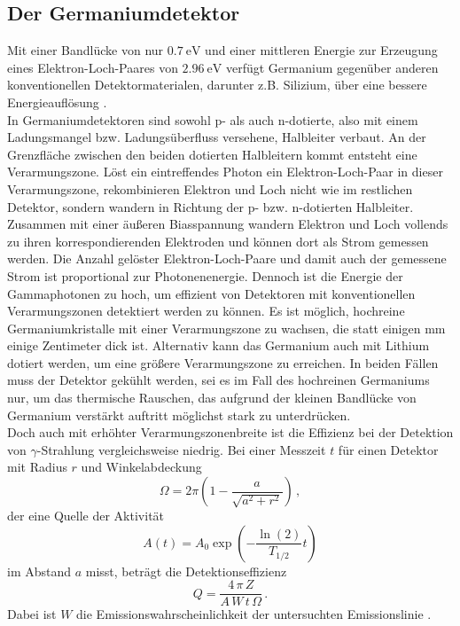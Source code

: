 \subsection{Der Germaniumdetektor}

Mit einer Bandlücke von nur $\SI{0,7}{\eV}$ und einer mittleren Energie zur Erzeugung eines Elektron-Loch-Paares von $\SI{2,96}{\eV}$ verfügt Germanium gegenüber anderen
konventionellen Detektormaterialen, darunter z.B. Silizium, über eine bessere Energieauflösung \cite{Teilchendetektoren}. \\
In Germaniumdetektoren sind sowohl p- als auch n-dotierte, also mit einem Ladungsmangel bzw. Ladungsüberfluss versehene, 
Halbleiter verbaut.
An der Grenzfläche zwischen den beiden dotierten Halbleitern kommt entsteht eine Verarmungszone. 
Löst ein eintreffendes Photon ein Elektron-Loch-Paar in dieser Verarmungszone,
rekombinieren Elektron und Loch nicht wie im restlichen Detektor, sondern wandern in Richtung der p- bzw. n-dotierten Halbleiter.
Zusammen mit einer äußeren Biasspannung wandern Elektron und Loch vollends zu ihren korrespondierenden Elektroden und können dort als Strom gemessen werden.
Die Anzahl gelöster Elektron-Loch-Paare und damit auch der gemessene Strom ist proportional zur Photonenenergie.
Dennoch ist die Energie der Gammaphotonen zu hoch, um effizient von Detektoren mit konventionellen Verarmungszonen detektiert werden zu können.
Es ist möglich, hochreine Germaniumkristalle mit einer Verarmungszone zu wachsen, die statt einigen $\si{\milli\meter}$ einige Zentimeter dick ist.
Alternativ kann das Germanium auch mit Lithium dotiert werden, um eine größere Verarmungszone zu erreichen.
In beiden Fällen muss der Detektor gekühlt werden, sei es im Fall des hochreinen Germaniums nur, um das thermische Rauschen,
das aufgrund der kleinen Bandlücke von Germanium verstärkt auftritt möglichst stark zu unterdrücken. \\

Doch auch mit erhöhter Verarmungszonenbreite ist die Effizienz bei der Detektion von $\gamma$-Strahlung vergleichsweise niedrig.
Bei einer Messzeit $t$ für einen Detektor mit Radius $r$ und Winkelabdeckung
\begin{equation*}
    \Omega = 2 \pi \left(1 - \frac{a}{\sqrt{a^2 + r^2}}\right) \,,
\end{equation*}
der eine Quelle der Aktivität
\begin{equation*}
    A(t) = A_0 \exp \left(-\frac{\ln(2)}{T_{1/2}} t \right)
\end{equation*}
im Abstand $a$ misst, beträgt die Detektionseffizienz
\begin{equation}
    Q = \frac{4 \, \pi \, Z}{A \, W \, t \, \Omega} \,.
\end{equation}
Dabei ist $W$ die Emissionswahrscheinlichkeit der untersuchten Emissionslinie \cite{gamma}.

